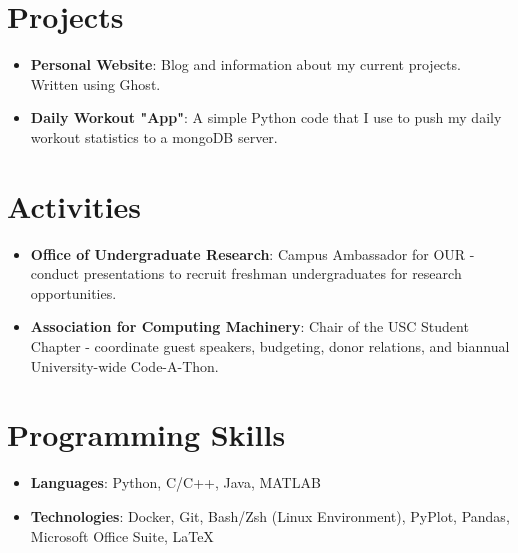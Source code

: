 \documentclass[letterpaper,11pt]{article}
\newcommand{\resumeItem}[2]{
  \item\small{
    \textbf{#1}{: #2 \vspace{-2pt}}
  }
}
\newcommand{\resumeSubItem}[2]{\resumeItem{#1}{#2}\vspace{-4pt}}
\newcommand{\resumeSubHeadingListStart}{\begin{itemize}[leftmargin=*]}
\newcommand{\resumeSubHeadingListEnd}{\end{itemize}}
\begin{document}
\section{Projects}
  \resumeSubHeadingListStart
    \resumeSubItem{Personal Website}
      {Blog and information about my current projects. Written using Ghost.}
    \resumeSubItem{Daily Workout "App"}
      {A simple Python code that I use to push my daily workout statistics to a mongoDB server.}
  \resumeSubHeadingListEnd

%
\section{Activities}
  \resumeSubHeadingListStart
    \resumeSubItem{Office of Undergraduate Research}
      {Campus Ambassador for OUR - conduct presentations to recruit freshman undergraduates for research opportunities.}
    \resumeSubItem{Association for Computing Machinery}
      {Chair of the USC Student Chapter - coordinate guest speakers, budgeting, donor relations, and biannual University-wide Code-A-Thon.}
  \resumeSubHeadingListEnd

%
\section{Programming Skills}
  \resumeSubHeadingListStart
    \resumeSubItem{Languages}{Python, C/C++, Java, MATLAB}
    \resumeSubItem{Technologies}{Docker, Git, Bash/Zsh (Linux Environment), PyPlot, Pandas, Microsoft Office Suite, \LaTeX}
  \resumeSubHeadingListEnd


\end{document}
